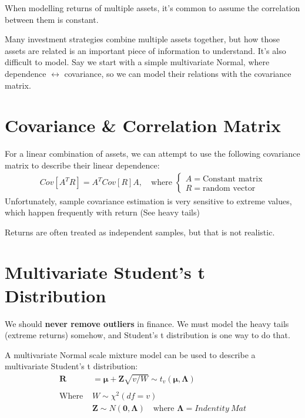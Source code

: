 \documentclass[
  oneside]{book}
\begin{document}
When modelling returns of multiple assets, it's common to assume the correlation between them is constant.

Many investment strategies combine multiple assets together, but how those assets are related is an important piece of information to understand. It's also difficult to model. Say we start with a simple multivariate Normal, where dependence \(\leftrightarrow\) covariance, so we can model their relations with the covariance matrix.

\hypertarget{covariance-correlation-matrix}{%
\section{Covariance \& Correlation Matrix}\label{covariance-correlation-matrix}}

For a linear combination of assets, we can attempt to use the following covariance matrix to describe their linear dependence:
\[
\begin{aligned}
Cov[A^{T}R] = A^{T}Cov[R]A, \quad \text{where }\begin{cases}
A = \text{Constant matrix} \\
R = \text{random vector}
\end{cases}
\end{aligned}
\]
Unfortunately, sample covariance estimation is very sensitive to extreme values, which happen frequently with return (See heavy tails)

Returns are often treated as independent samples, but that is not realistic.

\hypertarget{multivariate-students-t-distribution}{%
\section{Multivariate Student's t Distribution}\label{multivariate-students-t-distribution}}

We should \textbf{never remove outliers} in finance. We must model the heavy tails (extreme returns) somehow, and Student's t distribution is one way to do that.

A multivariate Normal scale mixture model can be used to describe a multivariate Student's t distribution:
\[
\begin{aligned}
\mathbf{R} &= \boldsymbol{\mu} + \mathbf{Z} \sqrt{ v/W } \sim t_{v}(\boldsymbol{\mu}, \boldsymbol{\Lambda})\\
\\
\text{Where } & W \sim \chi^{2}(df=v)\\
& \mathbf{Z} \sim N(\mathbf{0}, \boldsymbol{\Lambda}) \quad \text{where } \boldsymbol{\Lambda} = Indentity \ Mat
\end{aligned}
\]
\end{document}
